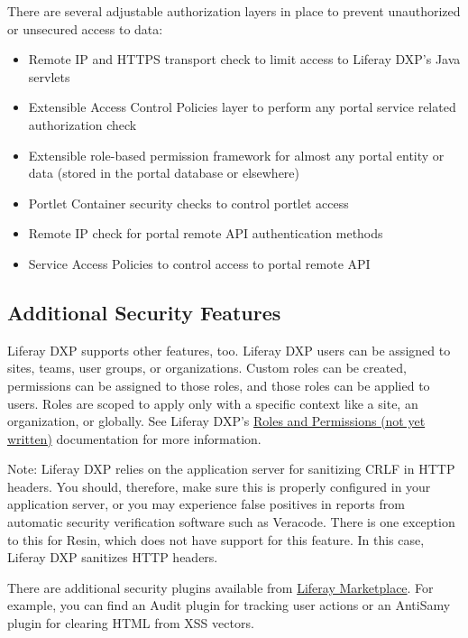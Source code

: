 There are several adjustable authorization layers in place to prevent
unauthorized or unsecured access to data:

\begin{itemize}
\tightlist
\item
  Remote IP and HTTPS transport check to limit access to Liferay DXP's
  Java servlets
\item
  Extensible Access Control Policies layer to perform any portal service
  related authorization check
\item
  Extensible role-based permission framework for almost any portal
  entity or data (stored in the portal database or elsewhere)
\item
  Portlet Container security checks to control portlet access
\item
  Remote IP check for portal remote API authentication methods
\item
  Service Access Policies to control access to portal remote API
\end{itemize}

\subsection{Additional Security
Features}\label{additional-security-features}

Liferay DXP supports other features, too. Liferay DXP users can be
assigned to sites, teams, user groups, or organizations. Custom roles
can be created, permissions can be assigned to those roles, and those
roles can be applied to users. Roles are scoped to apply only with a
specific context like a site, an organization, or globally. See Liferay
DXP's \href{}{Roles and Permissions (not yet written)} documentation for
more information.

\noindent\hrulefill

Note: Liferay DXP relies on the application server for sanitizing CRLF
in HTTP headers. You should, therefore, make sure this is properly
configured in your application server, or you may experience false
positives in reports from automatic security verification software such
as Veracode. There is one exception to this for Resin, which does not
have support for this feature. In this case, Liferay DXP sanitizes HTTP
headers.

\noindent\hrulefill

There are additional security plugins available from
\href{https://www.liferay.com/marketplace}{Liferay Marketplace}. For
example, you can find an Audit plugin for tracking user actions or an
AntiSamy plugin for clearing HTML from XSS vectors.

